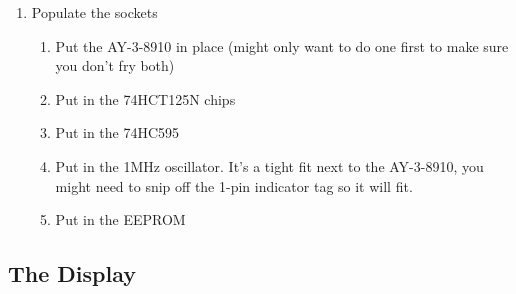 \documentclass[11pt]{article}
\begin{document}
\begin{enumerate}
\item Populate the sockets
	\begin{enumerate}
		\item Put the AY-3-8910 in place (might only want to do one first
			to make sure you don't fry both)
		\item Put in the 74HCT125N chips
		\item Put in the 74HC595
		\item Put in the 1MHz oscillator.  It's a tight fit next to the AY-3-8910,
			you might need to snip off the 1-pin indicator tag so it will fit.
		\item Put in the EEPROM
	\end{enumerate}
\end{enumerate}


		


\subsection{The Display}
\end{document}
